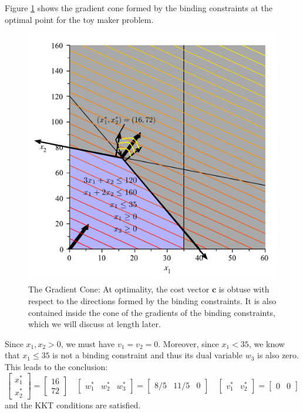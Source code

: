 \begin{example}
Figure \ref{fig:GradientCone} shows the gradient cone formed by the binding constraints at the optimal point for the toy maker problem. 
\begin{figure}[htbp]
\centering
\includegraphics[scale=0.35]{GradientCone.pdf}
\caption{The Gradient Cone: At optimality, the cost vector $\mathbf{c}$ is obtuse with respect to the directions formed by the binding constraints. It is also contained inside the cone of the gradients of the binding constraints, which we will discuss at length later.}
\label{fig:GradientCone}
\end{figure}
Since $x_1, x_2 > 0$, we must have $v_1 = v_2 = 0$. Moreover, since $x_1 < 35$, we know that $x_1 \leq 35$ is not a binding constraint and thus its dual variable $w_3$ is also zero. This leads to the conclusion:
\begin{displaymath}
\begin{bmatrix}
x_1^*\\
x_2^*
\end{bmatrix} = \begin{bmatrix}
16\\
72
\end{bmatrix} \quad 
\begin{bmatrix}
w_1^* & w_2^* & w_3^*
\end{bmatrix} = \begin{bmatrix}8/5 & 11/5 & 0\end{bmatrix} \quad \begin{bmatrix} v_1^* & v_2^*\end{bmatrix} = \begin{bmatrix}0 & 0\end{bmatrix}
\end{displaymath}
and the KKT conditions are satisfied.
\end{example}

